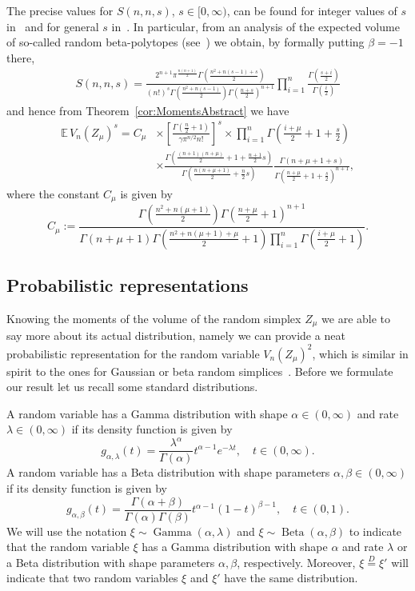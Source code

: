 \documentclass[AHL,Unicode,longabstracts,published]{cedram}
\newcommand{\EE}{\mathbb{E}\,}
\newcommand{\Gam}{\mathop{\mathrm{Gamma}}\nolimits}
\newcommand{\Bet}{\mathop{\mathrm{Beta}}\nolimits}
\begin{document}
The precise values for $S(n,n,s)$, $s\in[0,\infty)$, can be found for integer values of $s$ in~\cite{rM71} and for general $s$ in~\cite{KTT17}. In particular, from an analysis of the expected volume of so-called random beta-polytopes (see~\cite[Proposition~2.8]{KTT17}) we obtain, by formally putting $\beta=-1$ there,
\begin{align*}
S(n,n,s) = \frac{2^{n+1}\pi^{\frac{n(n+1)}{2}}\Gamma\left(\frac{n^2+n(s-1)+s}{2}\right)}{(n!)^s\Gamma\left(\frac{n^2+n(s-1)}{2}\right)\Gamma\left(\frac{n+s}{2}\right)^{n+1}}\prod\limits_{i=1}^{n}\frac{\Gamma\left(\frac{s+i}{2}\right)}{\Gamma\left(\frac{i}{2}\right)}
\end{align*}
and hence from Theorem~\ref{cor:MomentsAbstract} we have
\begin{equation}\label{eq:Moments}
\begin{aligned}
\EE V_n(Z_\mu)^s =C_{\mu}&\times\left[\frac{\Gamma\left(\frac{n}{2}+1\right)}{\gamma\pi^{n/2}n!}\right]^s\times\prod\limits_{i=1}^n\Gamma\left(\frac{i+\mu}{2}+1+\frac{s}{2}\right)\\
&\times\frac{\Gamma\left(\frac{(n+1)(n+\mu)}{2}+1+\frac{n+1}{2}s\right)}{\Gamma\left(\frac{n(n+\mu+1)}{2}+\frac{n}{2}s\right)}\frac{\Gamma(n+\mu+1+s)}{\Gamma\left(\frac{n+\mu}{2}+1+\frac{s}{2}\right)^{n+1}},
\end{aligned}
\end{equation}
where the constant $C_\mu$ is given by
\[
C_{\mu}:=\frac{\Gamma\left(\frac{n^2+n(\mu+1)}{2}\right)\Gamma\left(\frac{n+\mu}{2}+1\right)^{n+1}}{\Gamma(n+\mu+1)\Gamma\left(\frac{n^2+n(\mu+1)+\mu}{2}+1\right) \prod\limits_{i=1}^n\Gamma\left(\frac{i+\mu}{2}+1\right)}.
\]

\subsection{Probabilistic representations}

Knowing the moments of the volume of the random simplex $Z_{\mu}$ we are able to say more about its actual distribution, namely we can provide a neat probabilistic representation for the random variable $V_n(Z_{\mu})^2$, which is similar in spirit to the ones for Gaussian or beta random simplices~\cite{GKT17,rM71}. Before we formulate our result let us recall some standard distributions.

A random variable has a Gamma distribution with shape $\alpha\in(0,\infty)$ and rate $\lambda \in(0,\infty)$ if its density function is given by
\[
g_{\alpha,\lambda}(t)=\frac{\lambda^{\alpha}}{\Gamma(\alpha)}t^{\alpha-1}e^{-\lambda t},\quad t\in(0,\infty).
\]
A random variable has a Beta distribution with shape parameters $\alpha, \beta\in(0,\infty)$ if its density function is given by
\[
g_{\alpha,\beta}(t)=\frac{\Gamma(\alpha+\beta)}{\Gamma(\alpha)\Gamma(\beta)}t^{\alpha-1}(1-t)^{\beta - 1},\quad t\in(0,1).
\]
We will use the notation $\xi\sim \Gam(\alpha,\lambda)$ and $\xi\sim \Bet(\alpha,\beta)$ to indicate that the random variable $\xi$ has a Gamma distribution with shape $\alpha$ and rate $\lambda$ or a Beta distribution with shape parameters $\alpha, \beta$, respectively. Moreover, $\xi\overset{D}{=}\xi'$ will indicate that two random variables $\xi$ and $\xi'$ have the same distribution.
\end{document}
